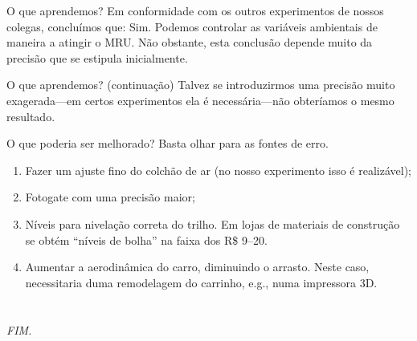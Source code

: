 \documentclass[
  leqno,
  aspectratio=169
]{beamer}
\begin{document}
  \begin{frame}{O que aprendemos?}
    Em conformidade com os outros experimentos de nossos colegas, conclu\'imos que: Sim. Podemos controlar as vari\'aveis ambientais de maneira a atingir o MRU. N\~ao obstante, esta conclus\~ao depende muito da precis\~ao que se estipula inicialmente. 
  \end{frame}

  \begin{frame}{O que aprendemos? (continua\c c\~ao)}
    Talvez se introduzirmos uma precis\~ao muito exagerada---em certos experimentos ela \'e necess\'aria---n\~ao obter\'iamos o mesmo resultado.
  \end{frame}

  \begin{frame}{O que poderia ser melhorado?}
    Basta olhar para as fontes de erro.
    \begin{enumerate}[label = \Roman*.]
      \item{%
        Fazer um ajuste fino do colchão de ar (no nosso experimento isso \'e realiz\'avel); 
      }
      \item{%
        Fotogate com uma precis\~ao maior;
      }
      \item{%
        N\'iveis para nivela\c c\~ao correta do trilho. Em lojas de materiais de constru\c c\~ao se obt\'em ``n\'iveis de bolha'' na faixa dos R\$ 9--20.
      }
      \item{%
        Aumentar a aerodin\^amica do carro, diminuindo o arrasto. Neste caso, necessitaria duma remodelagem do carrinho, e.g., numa impressora 3D.
      }
    \end{enumerate}
  \end{frame}
  
  \section{}
  \begin{frame}

    \vfill
    \noindent\hfill{\LARGE\it FIM.}\hfill\null
    \vfill
    
  \end{frame}



\end{document}
